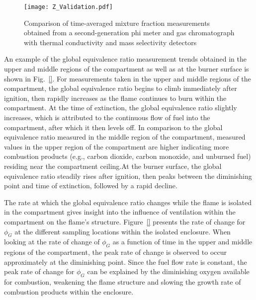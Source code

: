 \documentclass[12pt,letterpaper]{article}
\begin{document}
\begin{flushleft}
\begin{figure}[h!]
	\centering
\texttt{[image: Z\_Validation.pdf]}
	\caption[]{Comparison of time-averaged mixture fraction measurements obtained from a second-generation phi meter and gas chromatograph with thermal conductivity and mass selectivity detectors}
	\label{fig:Z_Val}
\end{figure}

An example of the global equivalence ratio measurement trends obtained in the upper and middle regions of the compartment as well as at the burner surface is shown in Fig.~\ref{}. For measurements taken in the upper and middle regions of the compartment, the global equivalence ratio begins to climb immediately after ignition, then rapidly increases as the flame continues to burn within the compartment. At the time of extinction, the global equivalence ratio slightly increases, which is attributed to the continuous flow of fuel into the compartment, after which it then levels off. In comparison to the global equivalence ratio measured in the middle region of the compartment, measured values in the upper region of the compartment are higher indicating more combustion products (e.g., carbon dioxide, carbon monoxide, and unburned fuel) residing near the compartment ceiling.At the burner surface, the global equivalence ratio steadily rises after ignition, then peaks between the diminishing point and time of extinction, followed by a rapid decline. 

The rate at which the global equivalence ratio changes while the flame is isolated in the compartment gives insight into the influence of ventilation within the compartment on the flame's structure. Figure~\ref{} presents the rate of change for $\phi_{G}$ at the different sampling locations within the isolated enclosure. When looking at the rate of change of $\phi_{G}$ as a function of time in the upper and middle regions of the compartment, the peak rate of change is observed to occur approximately at the diminishing point. Since the fuel flow rate is constant, the peak rate of change for $\phi_{G}$ can be explained by the diminishing oxygen available for combustion, weakening the flame structure and slowing the growth rate of combustion products within the enclosure.


\end{flushleft}
\end{document}
